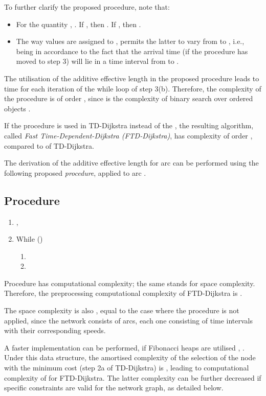 \documentclass[conference]{IEEEtran}
\begin{document}
To further clarify the proposed procedure, note that:

\begin{itemize}
    \item For the quantity , . If , then . If , then  .  
    \item The way values are assigned to , permits the latter to vary from  to , i.e., being in accordance to the fact that the arrival time (if the procedure has moved to step 3) will lie in a time interval from  to . 
\end{itemize}


   
The utilisation of the additive effective length in the proposed  procedure leads to  time for each iteration of the while loop of step 3(b). Therefore, the complexity of the  procedure is of order , since  is the complexity of binary search over  ordered objects \cite{ahuja}. 



If the  procedure is used in TD-Dijkstra instead of the , the resulting algorithm, called \emph{Fast Time-Dependent-Dijkstra (FTD-Dijkstra)}, has complexity of order , compared to  of TD-Dijkstra.  

The derivation of the additive effective length for arc  can be performed using the following proposed \emph{ procedure}, applied to arc .

\subsection{ Procedure}

\begin{enumerate}
    \item ,  
    \item While ()
    \begin{enumerate}
        \item 
        \item 
    \end{enumerate}    
\end{enumerate}


Procedure  has  computational complexity; the same stands for space complexity. Therefore, the preprocessing computational complexity of FTD-Dijkstra is . 

The space complexity is also , equal to the case where the  procedure is not applied, since the network consists of  arcs, each one consisting of  time intervals with their corresponding speeds. 


A faster implementation can be performed, if Fibonacci heaps are utilised \cite{fibonacci}, \cite{ahuja}. Under this data structure, the amortised complexity of the selection of the node with the minimum cost (step 2a of TD-Dijkstra) is , leading to computational complexity of  for FTD-Dijkstra. The latter complexity can be further decreased if specific constraints are valid for the network graph, as detailed below.
\end{document}
